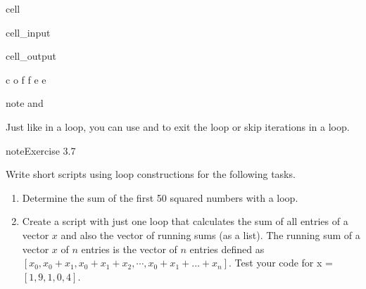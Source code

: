 \documentclass[letterpaper,10pt,english]{jupyterBook}
\begin{document}
\begin{sphinxuseclass}{cell}\begin{sphinxVerbatimInput}

\begin{sphinxuseclass}{cell_input}
\begin{sphinxVerbatim}[commandchars=\\\{\}]
  
   
\end{sphinxVerbatim}

\end{sphinxuseclass}\end{sphinxVerbatimInput}
\begin{sphinxVerbatimOutput}

\begin{sphinxuseclass}{cell_output}
\begin{sphinxVerbatim}[commandchars=\\\{\}]
c
o
f
f
e
e
\end{sphinxVerbatim}

\end{sphinxuseclass}\end{sphinxVerbatimOutput}

\end{sphinxuseclass}
\begin{sphinxadmonition}{note}{ and }

\sphinxAtStartPar
Just like in a  loop, you can use  and  to exit the loop or skip iterations in a  loop.
\end{sphinxadmonition}

\begin{sphinxadmonition}{note}{Exercise 3.7}

\sphinxAtStartPar
Write short scripts using loop constructions for the following tasks.
\begin{enumerate}
%
\item {} 
\sphinxAtStartPar
Determine the sum of the first 50 squared numbers with a loop.

\item {} 
\sphinxAtStartPar
Create a script with just one loop that calculates the sum of all entries of a vector \(x\) and also the vector of running sums (as a list). The running sum of a vector \(x\) of \(n\) entries is the vector of \(n\) entries defined as \([x_0, x_0+x_1, x_0+x_1+x_2, \cdots, x_0+x_1+\ldots+x_n]\). Test your code for x = \([1, 9, 1, 0, 4]\).

\end{enumerate}
\end{sphinxadmonition}
\end{document}
